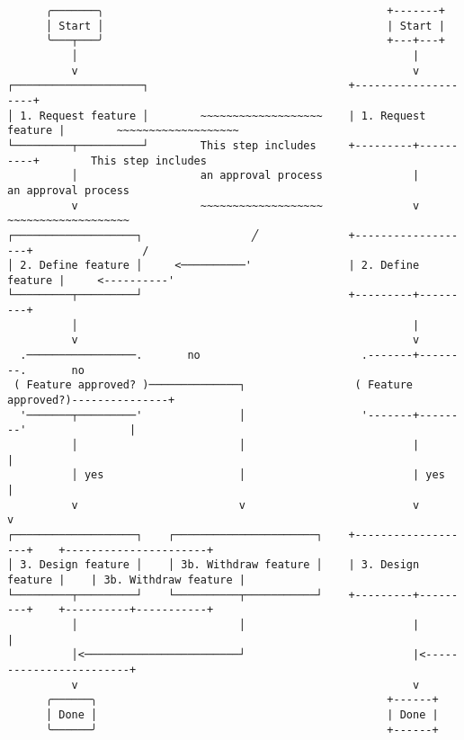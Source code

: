 \documentclass[varwidth=30cm,crop]{standalone}
\begin{document}
\begin{verbatim}
      ╭───────╮                                            +-------+									 
      │ Start │                                            | Start |									 
      ╰───┬───╯                                            +---+---+									 
          │                                                    |										 
          v                                                    v										 
┌────────────────────┐                               +--------------------+							 
│ 1. Request feature │        ~~~~~~~~~~~~~~~~~~~    | 1. Request feature |        ~~~~~~~~~~~~~~~~~~~
└─────────┬──────────┘        This step includes     +---------+----------+        This step includes 
          │                   an approval process              |                   an approval process
          v                   ~~~~~~~~~~~~~~~~~~~              v                   ~~~~~~~~~~~~~~~~~~~
┌───────────────────┐                 ╱              +-------------------+                 /			 
│ 2. Define feature │     <──────────'               | 2. Define feature |     <----------'			 
└─────────┬─────────┘                                +---------+---------+							 
          │                                                    |										 
          v                                                    v										 
  .─────────────────.       no                         .-------+--------.       no					 
 ( Feature approved? )──────────────┐                 ( Feature approved?)---------------+			 
  '───────┬─────────'               │                  '-------+--------'                |			 
          │                         │                          |                         |			 
          │ yes                     │                          | yes                     |			 
          v                         v                          v                         v			 
┌───────────────────┐    ┌──────────────────────┐    +-------------------+    +----------------------+
│ 3. Design feature │    │ 3b. Withdraw feature │    | 3. Design feature |    | 3b. Withdraw feature |
└─────────┬─────────┘    └──────────┬───────────┘    +---------+---------+    +----------+-----------+
          │                         │                          |                         |			 
          │<────────────────────────┘                          |<------------------------+			 
          v                                                    v										 
      ╭──────╮                                             +------+									 
      │ Done │                                             | Done |									 
      ╰──────╯                                             +------+                                   
\end{verbatim}
\end{document}
